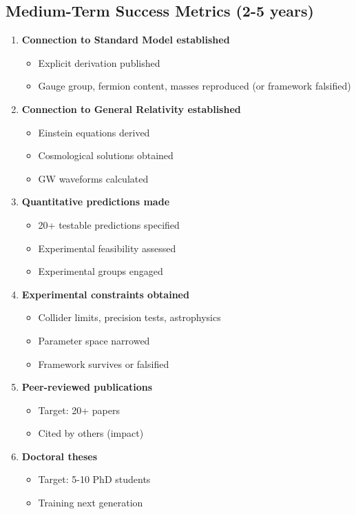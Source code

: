 \subsection{Medium-Term Success Metrics (2-5 years)}

\begin{enumerate}
    \item \textbf{Connection to Standard Model established}
    \begin{itemize}
        \item Explicit derivation published
        \item Gauge group, fermion content, masses reproduced (or framework falsified)
    \end{itemize}

    \item \textbf{Connection to General Relativity established}
    \begin{itemize}
        \item Einstein equations derived
        \item Cosmological solutions obtained
        \item GW waveforms calculated
    \end{itemize}

    \item \textbf{Quantitative predictions made}
    \begin{itemize}
        \item 20+ testable predictions specified
        \item Experimental feasibility assessed
        \item Experimental groups engaged
    \end{itemize}

    \item \textbf{Experimental constraints obtained}
    \begin{itemize}
        \item Collider limits, precision tests, astrophysics
        \item Parameter space narrowed
        \item Framework survives or falsified
    \end{itemize}

    \item \textbf{Peer-reviewed publications}
    \begin{itemize}
        \item Target: 20+ papers
        \item Cited by others (impact)
    \end{itemize}

    \item \textbf{Doctoral theses}
    \begin{itemize}
        \item Target: 5-10 PhD students
        \item Training next generation
    \end{itemize}
\end{enumerate}

